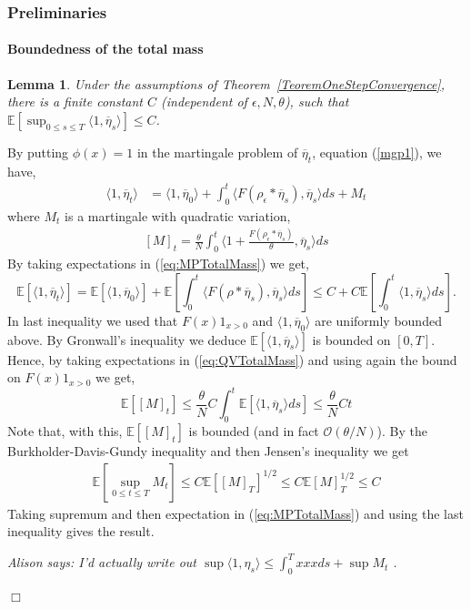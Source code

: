 \documentclass[12pt]{article}
\newenvironment {proof}{{\noindent\bf Proof }}{\hfill $\Box$ \medskip}
\newtheorem{lemma}[theorem]{Lemma}
\newcommand{\IE}{\mathbb E}
\newcommand{\comment}[1]{{\color{blue} \it #1}}
\begin{document}
\subsubsection{Preliminaries}

\paragraph{Boundedness of the total mass}
\begin{lemma} \label{Lemma:UniformlyBoundedMass}
Under the assumptions of Theorem~\ref{TeoremOneStepConvergence}, there is a finite constant $C$ (independent of $\epsilon, N, \theta$), such that $\IE\left[ \sup_{0 \leq s \leq T} \langle 1, \overline{\eta}_s \rangle \right] \leq C$.
\end{lemma}
\begin{proof}
By putting $\phi(x)=1$ in the martingale problem of $\overline{\eta}_t$, equation (\ref{mgp1}), we have,
\begin{align} \label{eq:MPTotalMass}
\langle 1, \overline{\eta}_t \rangle &= \langle 1, \overline{\eta}_0 \rangle + \int_0^t \langle F(\rho_\epsilon * \overline{\eta}_s), \overline{\eta}_s \rangle ds + M_t
\end{align}
where $M_t$ is a martingale with quadratic variation,
\begin{align} \label{eq:QVTotalMass}
[M]_t = \frac{\theta}{N}\int_0^t \langle 1 + \frac{F(\rho_\epsilon* \overline{\eta}_s)}{\theta}, \overline{\eta}_s \rangle d s 
\end{align}
By taking expectations in (\ref{eq:MPTotalMass}) we get,
\[ \IE[\langle 1, \overline{\eta}_t \rangle] =  \IE[\langle 1, \overline{\eta}_0 \rangle]  + \IE[ \int_0^t \langle F(\rho * \overline{\eta}_s), \overline{\eta}_s \rangle ds ]   \leq C +   C \mathbb{E}\left[ \int_0^t \langle 1, \overline{\eta}_s \rangle ds \right].\] 
In last inequality we used that $F(x)1_{x >0}$ and $\langle 1, \overline{\eta}_0 \rangle$ are uniformly bounded above. By Gronwall's inequality we deduce $\IE[\langle 1, \overline{\eta}_s \rangle]$ is bounded on $[0,T]$. Hence, by taking expectations in (\ref{eq:QVTotalMass}) and using again the bound on $F(x)1_{x>0}$ we get,
\begin{equation} \IE\left[ [M]_t \right] \leq \frac{\theta}{N} C \int_0^t \mathbb{E}\left[ \langle 1, \overline{\eta}_s \rangle ds \right] \leq \frac{\theta}{N}C t \label{eq:quadvarMass} \end{equation}
Note that, with this, $\IE[ [M]_t]$ is bounded (and in fact $\mathcal{O}(\theta/N)$). By the Burkholder-Davis-Gundy inequality and then Jensen's inequality we get
\begin{align*}
    \IE\left[ \sup_{0 \leq t \leq T} M_t \right]
    \leq
    C \IE\left[ [M]_T \right]^{1/2}
    \leq
    C \IE[M]_T^{1/2}
    \leq
    C  
\end{align*}
Taking supremum and then expectation in (\ref{eq:MPTotalMass}) and using the last inequality gives the result.

    \comment{Alison says: I'd actually write out
    $\sup \langle 1, \eta_s \rangle \le \int_0^T xxx ds + \sup M_t$ .
    }

\end{proof}
\end{document}
